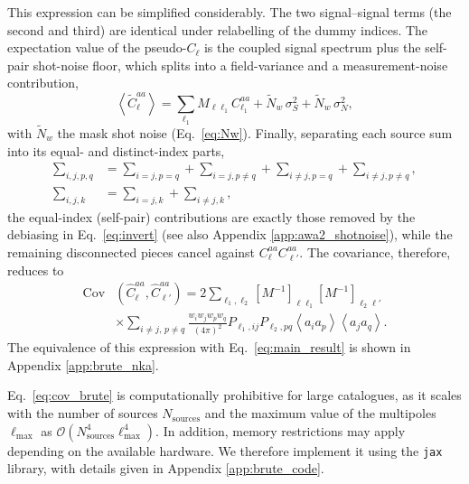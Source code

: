 \documentclass[%
 reprint,
superscriptaddress,
nofootinbib,
 amsmath,amssymb,
 aps,
 prd,
]{revtex4-2}
\begin{document}
This expression can be simplified considerably. The two signal--signal terms (the second and third) are identical under relabelling of the dummy indices. The expectation value of the pseudo-$C_\ell$ is the coupled signal spectrum plus the self-pair shot-noise floor, which splits into a field-variance and a measurement-noise contribution,
\begin{equation}
    \left\langle \tilde{C}_{\ell}^{aa} \right\rangle = \sum_{\ell_1} M_{\ell\ell_1} C_{\ell_1}^{aa}  + \tilde{N}_{w} \, \sigma_{S}^{2} + \tilde{N}_{w} \, \sigma_{N}^{2},
\end{equation}
with $\tilde{N}_w$ the mask shot noise (Eq.~\ref{eq:Nw}). Finally, separating each source sum into its equal- and distinct-index parts,
\begin{equation}
\begin{aligned}
    \sum_{i,j, p, q} &= \sum_{i=j, p= q} + \sum_{i=j, p\not= q} + \sum_{i\not=j, p= q} + \sum_{i\not=j, p\not= q},\\
    \sum_{i,j, k} &= \sum_{i=j, k} + \sum_{i\not=j, k},
\end{aligned}
\end{equation}
the equal-index (self-pair) contributions are exactly those removed by the debiasing in Eq.~\ref{eq:invert} (see also Appendix \ref{app:awa2_shotnoise}), while the remaining disconnected pieces cancel against $C_\ell^{aa}C_{\ell'}^{aa}$. The covariance, therefore, reduces to
\begin{equation} \label{eq:cov_brute}
\begin{split}
    \mathrm{Cov}&(\hat{C}_\ell^{aa}, \hat{C}_{\ell'}^{aa})  =  2\sum_{\ell_1,\ell_2} [M^{-1}]_{\ell\ell_1} [M^{-1}]_{\ell_2\ell'} \\
    &\times \sum_{i \not= j,\, p \not= q}\frac{w_i w_jw_p w_q}{(4\pi)^2}   P_{\ell_1, ij} P_{\ell_2, pq}
     \left\langle a_i a_p \right\rangle \left\langle a_j a_q \right\rangle.
\end{split}
\end{equation}
The equivalence of this expression with Eq.~\ref{eq:main_result} is shown in Appendix \ref{app:brute_nka}.

 Eq.~\ref{eq:cov_brute} is computationally prohibitive for large catalogues, as it scales with the number of sources $N_\mathrm{sources}$ and the maximum value of the multipoles $\ell_\mathrm{max}$  as $\mathcal{O}(N_{\mathrm{sources}}^4 \ell_\mathrm{max}^4)$. In addition, memory restrictions may apply depending on the available hardware. We therefore implement it using the \texttt{jax} \cite{jax2018github} library, with details given in Appendix \ref{app:brute_code}.
 
\end{document}
